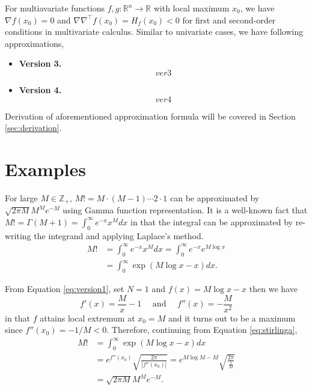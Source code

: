 \documentclass[fontsize=12pt]{article}
\begin{document}
For multiavariate functions $f,g : \mathbb{R}^n \rightarrow \mathbb{R}$ with local maximum $x_0$, we have $\nabla f(x_0) = 0$ and $\nabla \nabla^\top f(x_0) = H_f (x_0) < 0$ for first and second-order conditions in multivariate calculus. Similar to univariate cases, we have following approximations,
\begin{itemize}
	\item \textbf{Version 3.}
	\begin{equation}\label{eq:version3}
	ver3
	\end{equation}
	\item \textbf{Version 4.}
	\begin{equation}\label{eq:version4}
	ver4
	\end{equation}
\end{itemize}
Derivation of aforementioned approximation formula will be covered in Section \ref{sec:derivation}. 

\section{Examples}\label{sec:example}

For large $M \in \mathbb{Z}_+$, $M! = M\cdot(M-1)\cdots 2 \cdot 1$ can be approximated by $\sqrt{2\pi M} M^M e^{-M}$ using Gamma function representation. It is a well-known fact that $M! = \Gamma(M+1) = \int_{0}^\infty e^{-x} x^M dx$ in that the integral can be approximated by re-writing the integrand and applying Laplace's method.
\begin{align}
M! &= \int_0^\infty e^{-x} x^M dx = \int_0^\infty e^{-x} e^{M\log x} \nonumber \\
&= \int_0^\infty \exp \left( M\log x - x \right) dx \label{eq:stirlinga}.
\end{align}

From Equation \eqref{eq:version1}, set $N=1$ and $f(x) = M \log x - x$ then we have 
\begin{equation*}
f'(x) = \frac{M}{x} - 1\quad \textrm{ and } \quad f''(x) = -\frac{M}{x^2}
\end{equation*}
in that $f$ attains local extremum at $x_0 = M$ and it turns out to be a maximum since $f''(x_0) = -1/M < 0$. Therefore, continuing from Equation \eqref{eq:stirlinga},
\begin{align*}
M!&= \int_0^\infty \exp (M \log x - x) dx \\
&= e^{f''(x_0)} \sqrt{\frac{2\pi}{|f''(x_0)|}} = e^{M \log M - M}  \sqrt{\frac{2\pi}{\frac{1}{M}}}\\
&= \sqrt{2\pi M} M^M e^{-M}.
\end{align*}
\end{document}
